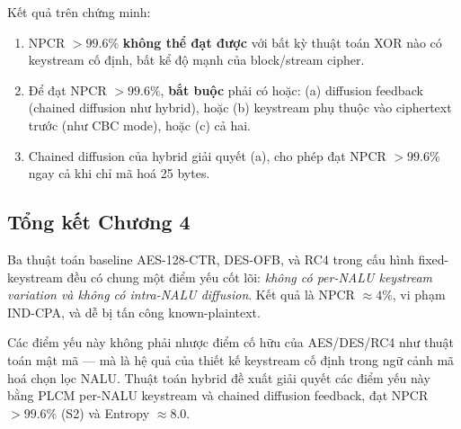 Kết quả trên chứng minh:
\begin{enumerate}
  \item NPCR $> 99.6\%$ \textbf{không thể đạt được} với bất kỳ thuật toán XOR nào
        có keystream cố định, bất kể độ mạnh của block/stream cipher.

  \item Để đạt NPCR $> 99.6\%$, \textbf{bắt buộc} phải có hoặc:
        (a) diffusion feedback (chained diffusion như hybrid), hoặc
        (b) keystream phụ thuộc vào ciphertext trước (như CBC mode), hoặc
        (c) cả hai.

  \item Chained diffusion của hybrid giải quyết (a), cho phép đạt NPCR $> 99.6\%$
        ngay cả khi chỉ mã hoá 25 bytes.
\end{enumerate}

\subsection{Tổng kết Chương 4}

Ba thuật toán baseline AES-128-CTR, DES-OFB, và RC4 trong cấu hình fixed-keystream
đều có chung một điểm yếu cốt lõi: \emph{không có per-NALU keystream variation và
không có intra-NALU diffusion}. Kết quả là NPCR $\approx 4\%$, vi phạm IND-CPA,
và dễ bị tấn công known-plaintext.

Các điểm yếu này không phải nhược điểm cố hữu của AES/DES/RC4 như thuật toán mật mã
--- mà là hệ quả của thiết kế keystream cố định trong ngữ cảnh mã hoá chọn lọc NALU.
Thuật toán hybrid đề xuất giải quyết các điểm yếu này bằng PLCM per-NALU keystream
và chained diffusion feedback, đạt NPCR $> 99.6\%$ (S2) và Entropy $\approx 8.0$.
